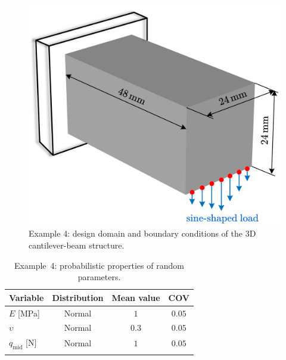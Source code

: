 \documentclass[preprint,3p]{elsarticle}
\begin{document}
\begin{linenumbers}
\begin{figure}
	\begin{center}
		\includegraphics[scale=0.58]{Fig13.jpg}
	\end{center}
	\caption{Example 4: design domain and boundary conditions of the 3D cantilever-beam structure.}
	\label{FIG:13}
\end{figure}

\begin{table}
    \caption{Example~4: probabilistic properties of random parameters.}
    \label{Table7}
    \begin{center}
        \begin{tabular}{lccc}
            \hline \noalign{\smallskip}
            Variable & Distribution & Mean value & COV\\
            \hline \noalign{\smallskip}
            $E$ [MPa] &    Normal  & $1$ & $0.05$\\
            $\upsilon$ &    Normal &    $0.3$ &  $0.05$\\
            $q_\text{mid}$ [N] &    Normal &    $1$ &  $0.05$\\
            \hline \noalign{\smallskip}
        \end{tabular}
    \end{center}
\end{table}


\end{linenumbers}
\end{document}
